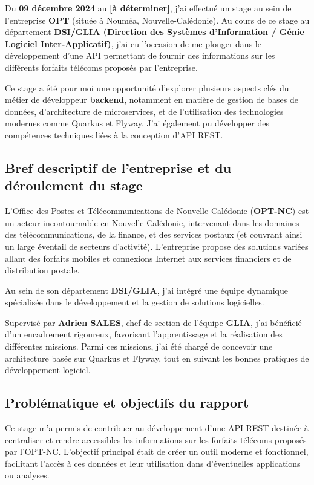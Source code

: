\documentclass{article}
\begin{document}
	Du \textbf{09 décembre 2024} au \textbf{[à déterminer]}, j’ai effectué un stage au sein de l’entreprise \textbf{OPT} (située à Nouméa, Nouvelle-Calédonie). Au cours de ce stage au département \textbf{DSI/GLIA (Direction des Systèmes d'Information / Génie Logiciel Inter-Applicatif)}, j’ai eu l’occasion de me plonger dans le développement d’une API permettant de fournir des informations sur les différents forfaits télécoms proposés par l’entreprise.
	
	Ce stage a été pour moi une opportunité d’explorer plusieurs aspects clés du métier de développeur \textbf{backend}, notamment en matière de gestion de bases de données, d’architecture de microservices, et de l’utilisation des technologies modernes comme Quarkus et Flyway. J’ai également pu développer des compétences techniques liées à la conception d’API REST.
	
	\subsection{Bref descriptif de l’entreprise et du déroulement du stage}
	
	L’Office des Postes et Télécommunications de Nouvelle-Calédonie (\textbf{OPT-NC}) est un acteur incontournable en Nouvelle-Calédonie, intervenant dans les domaines des télécommunications, de la finance, et des services postaux (et couvrant ainsi un large éventail de secteurs d'activité). L’entreprise propose des solutions variées allant des forfaits mobiles et connexions Internet aux services financiers et de distribution postale.
	
	Au sein de son département \textbf{DSI/GLIA}, j’ai intégré une équipe dynamique spécialisée dans le développement et la gestion de solutions logicielles.
	
	
	Supervisé par \textbf{Adrien SALES}, chef de section de l’équipe \textbf{GLIA}, j’ai bénéficié d’un encadrement rigoureux, favorisant l’apprentissage et la réalisation des différentes missions. Parmi ces missions, j’ai été chargé de concevoir une architecture basée sur Quarkus et Flyway, tout en suivant les bonnes pratiques de développement logiciel.
	
	\subsection{Problématique et objectifs du rapport}
	
	Ce stage m’a permis de contribuer au développement d’une API REST destinée à centraliser et rendre accessibles les informations sur les forfaits télécoms proposés par l’OPT-NC. L’objectif principal était de créer un outil moderne et fonctionnel, facilitant l’accès à ces données et leur utilisation dans d’éventuelles applications ou analyses.
	
\end{document}

